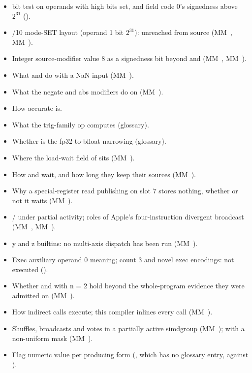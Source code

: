 \begin{itemize}
\item {} bit test on operands with high bits set, and field code 0's signedness above $2^{31}$ ().
\item {}/10 mode-SET layout (operand 1 bit $2^{31}$): unreached from source (MM~, MM~).
\item Integer source-modifier value 8 as a signedness bit beyond  and  (MM~, MM~).
\item What  and  do with a NaN input (MM~).
\item What the negate and abs modifiers do on  (MM~).
\item How accurate  is.
\item What the trig-family op  computes (glossary).
\item Whether  is the fp32-to-bfloat narrowing (glossary).
\item Where the load-wait field of  sits (MM~).
\item How  and  wait, and how long they keep their sources (MM~).
\item Why a special-register read publishing on slot 7 stores nothing, whether or not it waits (MM~).
\item {} /  under partial activity; roles of Apple's four-instruction divergent broadcast (MM~, MM~).
\item y and z builtins: no multi-axis dispatch has been run (MM~).
\item Exec auxiliary operand 0 meaning; count 3 and novel exec encodings: not executed ().
\item Whether  and  with n = 2 hold beyond the whole-program evidence they were admitted on (MM~).
\item How indirect calls execute; this compiler inlines every call (MM~).
\item Shuffles, broadcasts and votes in a partially active simdgroup (MM~);  with a non-uniform mask (MM~).
\item Flag numeric value per producing form (, which has no glossary entry, against ).
\end{itemize}

